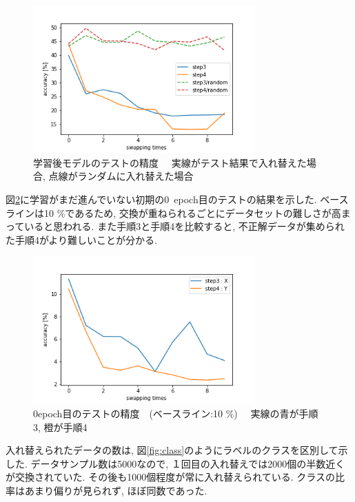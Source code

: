 \documentclass[twocolumn]{jarticle}     %
\begin{document}
\begin{figure}[tb]
	\begin{center}
		\includegraphics[clip,width=8.5cm]{accuracy.png}
		\caption{学習後モデルのテストの精度　
		実線がテスト結果で入れ替えた場合,
    点線がランダムに入れ替えた場合}
		\label{fig:accuracy}
	\end{center}
\end{figure}

図\ref{fig:accuracy_start}に学習がまだ進んでいない初期の0~epoch目のテストの結果を示した. ベースラインは10 \%であるため, 交換が重ねられるごとにデータセットの難しさが高まっていると思われる. また手順3と手順4を比較すると, 不正解データが集められた手順4がより難しいことが分かる.

\begin{figure}[tb]
	\begin{center}
		\includegraphics[clip,width=8.5cm]{accuracy_start.png}
		\caption{0epoch目のテストの精度　(ベースライン:10 \%)　
		実線の青が手順3, 橙が手順4}
		\label{fig:accuracy_start}
	\end{center}
\end{figure}

入れ替えられたデータの数は, 図\ref{fig:class}のようにラベルのクラスを区別して示した. データサンプル数は5000なので, １回目の入れ替えでは2000個の半数近くが交換されていた. その後も1000個程度が常に入れ替えられている. クラスの比率はあまり偏りが見られず, ほぼ同数であった.
\end{document}
